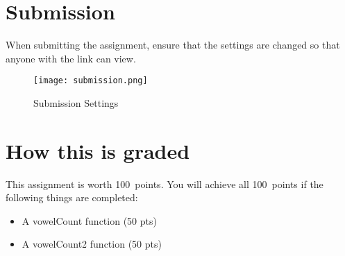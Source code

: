 \documentclass{article}
\newcommand{\AValue}{100}
\begin{document}
\section*{Submission}
When submitting the assignment, ensure that the settings are changed so that anyone with the link can view.
\begin{figure}[H]
  \centering
  \texttt{[image: submission.png]}
  \caption{Submission Settings}
\end{figure}

\section*{How this is graded}
This assignment is worth \AValue \ points. You will achieve all \AValue \   points if the following things are completed:
\begin{itemize}
    \item A vowelCount function (50 pts)
    \item A vowelCount2 function (50 pts)
\end{itemize}
\end{document}
